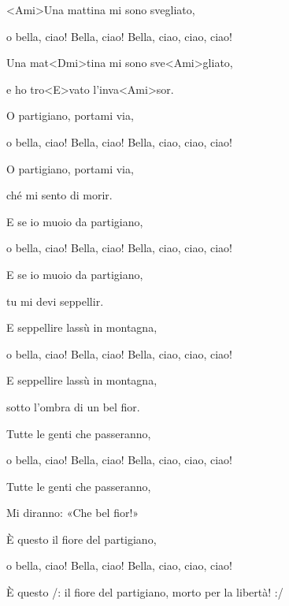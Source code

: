 

\zs
<Ami>Una mattina mi sono svegliato,

o bella, ciao! Bella, ciao! Bella, ciao, ciao, ciao!

Una mat<Dmi>tina mi sono sve<Ami>gliato,

e ho tro<E>vato l'inva<Ami>sor.
\ks

\zs
O partigiano, portami via,

o bella, ciao! Bella, ciao! Bella, ciao, ciao, ciao!

O partigiano, portami via,

ché mi sento di morir.
\ks

\zs
E se io muoio da partigiano,

o bella, ciao! Bella, ciao! Bella, ciao, ciao, ciao!

E se io muoio da partigiano,

tu mi devi seppellir.
\ks

\zs
E seppellire lassù in montagna,

o bella, ciao! Bella, ciao! Bella, ciao, ciao, ciao!

E seppellire lassù in montagna,

sotto l'ombra di un bel fior.
\ks

\zs
Tutte le genti che passeranno,

o bella, ciao! Bella, ciao! Bella, ciao, ciao, ciao!

Tutte le genti che passeranno,

Mi diranno: «Che bel fior!»
\ks

\zs
È questo il fiore del partigiano,

o bella, ciao! Bella, ciao! Bella, ciao, ciao, ciao!

È questo /: il fiore del partigiano, morto per la libertà! :/

\ks

\kp
